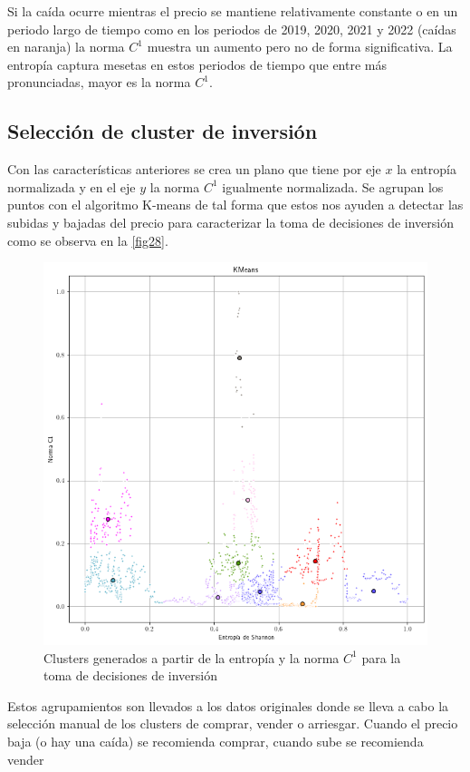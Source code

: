 Si la caída ocurre mientras el precio se mantiene relativamente constante o en un periodo largo de tiempo como en los periodos de 2019, 2020, 2021 y 2022 (caídas en naranja) la norma $C^1$ muestra un aumento pero no de forma significativa. La entropía captura mesetas en estos periodos de tiempo que entre más pronunciadas, mayor es la norma $C^1$.
\subsection{Selección de cluster de inversión}

Con las características anteriores se crea un plano que tiene por eje $x$ la entropía normalizada y en el eje $y$ la norma $C^1$ igualmente normalizada. Se agrupan los puntos con el algoritmo K-means de tal forma que estos nos ayuden a detectar las subidas y bajadas del precio para caracterizar la toma de decisiones de inversión como se observa en la \autoref{fig28}.

\begin{figure}[h!]
	\centering
	\includegraphics[scale=0.5]{Chapter5/calsifica_kmeans.png}
	\caption{Clusters generados a partir de la entropía y la norma $C^1$ para la toma de decisiones de inversión}
	\label{fig28}
\end{figure}

Estos agrupamientos son llevados a los datos originales donde se lleva a cabo la selección manual de los clusters de comprar, vender o arriesgar. Cuando el precio baja (o hay una caída) se recomienda comprar, cuando sube se recomienda vender

